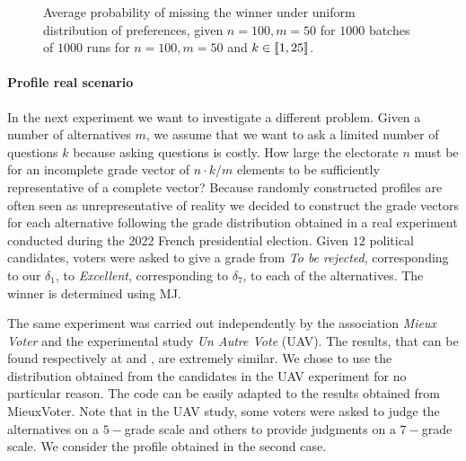 	
	\begin{figure}
		\centering
		\caption{Average probability of missing the winner under uniform distribution of preferences, given $n=100, m=50$ for $1000$ batches of $1000$ runs for $n=100,m=50$ and $k\in \llbracket1,25\rrbracket$.}
		\label{fig:MJelicitationIC}
	\end{figure}
	
	\paragraph{Profile real scenario}
	In the next experiment we want to investigate a different problem. Given a number of alternatives $m$, we assume that we want to ask a limited number of questions $k$ because asking questions is costly. How large the electorate $n$ must be for an incomplete grade vector of $n\cdot k/m$ elements to be sufficiently representative of a complete vector?
	Because randomly constructed profiles are often seen as unrepresentative of reality we decided to construct the grade vectors for each alternative following the grade distribution obtained in a real experiment conducted during the 2022 French presidential election.
	Given $12$ political candidates, voters were asked to give a grade from \textit{To be rejected}, corresponding to our $\delta_1$, to \textit{Excellent}, corresponding to $\delta_7$, to each of the alternatives. The winner is determined using \ac{MJ}.
	
	The same experiment was carried out independently by the association \textit{Mieux Voter} and the experimental study \textit{Un Autre Vote} (UAV). The results, that can be found respectively at \citet{MieuxVoterElection2022} and \citet{UAVElection2022}, are extremely similar.  We chose to use the distribution obtained from the candidates in the UAV experiment for no particular reason. The code can be easily adapted to the results obtained from MieuxVoter.
	Note that in the UAV study, some voters were asked to judge the alternatives on a $5-$grade scale and others to provide judgments on a $7-$grade scale. We consider the profile obtained in the second case.
	
